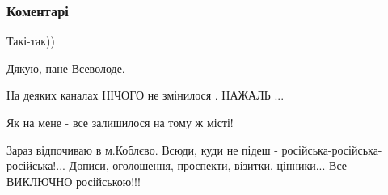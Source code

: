  
 
 
 
 
\subsubsection{Коментарі}
\label{sec:18_07_2021.fb.chebodajev_vsevolod.1.ukrainizacia_film_foto.cmt}

\begin{itemize}
 
Такі-так))

 
Дякую, пане Всеволоде.

 
На деяких каналах НІЧОГО не змінилося .
НАЖАЛЬ ...

 

Як на мене - все залишилося на тому ж місті!

Зараз відпочиваю в м.Коблєво. Всюди, куди не підеш -
російська-російська-російська!... Дописи, оголошення, проспекти, візитки,
цінники... Все ВИКЛЮЧНО російською!!!

 

\end{itemize}
